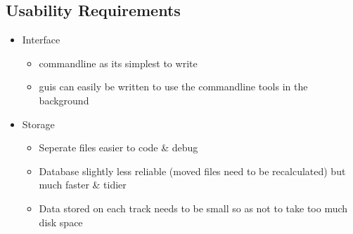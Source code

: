 \subsection{Usability Requirements}
\begin{itemize}
	\item Interface
	\begin{itemize}
		\item commandline as its simplest to write
		\item guis can easily be written to use the commandline tools in the background
	\end{itemize}
	\item Storage
	\begin{itemize}
		\item Seperate files easier to code \& debug
		\item Database slightly less reliable (moved files need to be recalculated) but much faster \& tidier
		\item Data stored on each track needs to be small so as not to take too much disk space
	\end{itemize}
\end{itemize}

